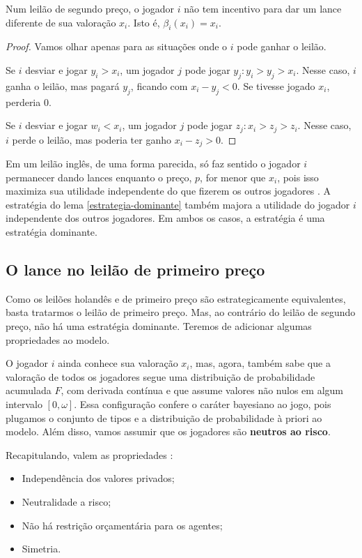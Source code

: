 \begin{lema}
    \label{estrategia-dominante}
    Num leilão de segundo preço, o jogador $i$ não tem incentivo para dar um lance diferente de sua valoração $x_i$. Isto é, $\beta_{i}(x_i) = x_i$.
\end{lema}
\begin{proof}
    Vamos olhar apenas para as situações onde o $i$ pode ganhar o leilão.

    Se $i$ desviar e jogar $y_i > x_i$, um jogador $j$ pode jogar $y_j : y_i > y_j > x_i$. Nesse caso, $i$ ganha o leilão, mas pagará $y_j$, ficando com $x_i - y_j < 0$. Se tivesse jogado $x_i$, perderia 0.

    Se $i$ desviar e jogar $w_i < x_i$, um jogador $j$ pode jogar $z_j : x_i > z_j > z_i$. Nesse caso, $i$ perde o leilão, mas poderia ter ganho $x_i - z_j > 0$.
\end{proof}

Em um leilão inglês, de uma forma parecida, só faz sentido o jogador $i$ permanecer dando lances enquanto o preço, $p$, for menor que $x_i$, pois isso maximiza sua utilidade independente do que fizerem os outros jogadores \citet{karlin2017game}. A estratégia do lema \ref{estrategia-dominante} também majora a utilidade do jogador $i$ independente dos outros jogadores. Em ambos os casos, a estratégia é uma estratégia dominante.

\subsection{O lance no leilão de primeiro preço}

Como os leilões holandês e de primeiro preço são estrategicamente equivalentes, basta tratarmos o leilão de primeiro preço. Mas, ao contrário do leilão de segundo preço, não há uma estratégia dominante. Teremos de adicionar algumas propriedades ao modelo.

O jogador $i$ ainda conhece sua valoração $x_i$, mas, agora, também sabe que a valoração de todos os jogadores segue uma distribuição de probabilidade acumulada $F$, com derivada contínua e que assume valores não nulos em algum intervalo $[0, \omega]$. Essa configuração confere o caráter bayesiano ao jogo, pois plugamos o conjunto de tipos e a distribuição de probabilidade à priori ao modelo. Além disso, vamos assumir que os jogadores são \textbf{neutros ao risco}.

Recapitulando, valem as propriedades \citet{krishna}:
\begin{itemize}
	\item Independência dos valores privados;
	\item Neutralidade a risco;
	\item Não há restrição orçamentária para os agentes;
	\item Simetria.
\end{itemize}

